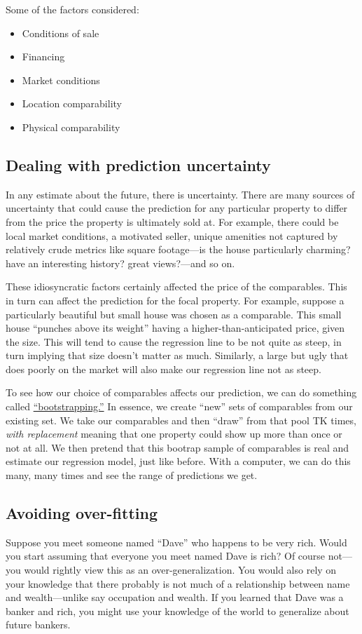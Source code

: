 \documentclass[
12pt, %
letterpaper, %
oneside, %
headinclude,footinclude, %
BCOR5mm, %
]{scrartcl}
\begin{document}
Some of the factors considered: 
\begin{itemize}
\item Conditions of sale
\item Financing
\item Market conditions
\item Location comparability
\item Physical comparability 
\end{itemize}

\subsection{Dealing with prediction uncertainty}  \label{sec:bootstrapping} 
In any estimate about the future, there is uncertainty.
There are many sources of uncertainty that could cause the prediction for any particular property to differ from the price the property is ultimately sold at.
For example, there could be local market conditions, a motivated seller, unique amenities not captured by relatively crude metrics like square footage---is the house particularly charming? have an interesting history? great views?---and so on. 

These idiosyncratic factors certainly affected the price of the comparables.
This in turn can affect the prediction for the focal property. 
For example, suppose a particularly beautiful but small house was chosen as a comparable.
This small house ``punches above its weight'' having a higher-than-anticipated price, given the size.
This will tend to cause the regression line to be not quite as steep, in turn implying that size doesn't matter as much.
Similarly, a large but ugly that does poorly on the market will also make our regression line not as steep.

To see how our choice of comparables affects our prediction, we can do something called \href{https://en.wikipedia.org/wiki/Bootstrapping_(statistics)}{``bootstrapping.''}
In essence, we create ``new'' sets of comparables from our existing set.
We take our comparables and then ``draw'' from that pool TK times, \emph{with replacement} meaning that one property could show up more than once or not at all.
We then pretend that this bootrap sample of comparables is real and estimate our regression model, just like before.
With a computer, we can do this many, many times and see the range of predictions we get. 

\subsection{Avoiding over-fitting} \label{sec:regularization}
Suppose you meet someone named ``Dave'' who happens to be very rich.
Would you start assuming that everyone you meet named Dave is rich?
Of course not---you would rightly view this as an over-generalization.
You would also rely on your knowledge that there probably is not much of a relationship between name and wealth---unlike say occupation and wealth.
If you learned that Dave was a banker and rich, you might use your knowledge of the world to generalize about future bankers.
\end{document}
